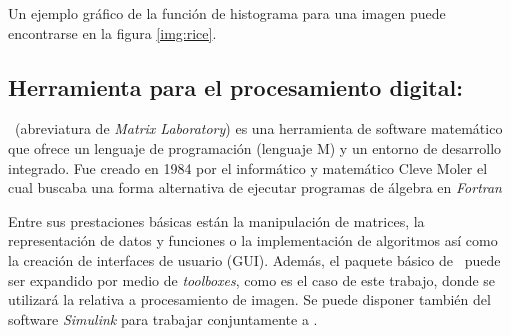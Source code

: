\documentclass[main]{subfiles}
\begin{document}
Un ejemplo gráfico de la función de histograma para una imagen puede encontrarse en la figura \ref{img:rice}.


\subsection{Herramienta para el procesamiento digital: \MATLAB}\label{sec:matlab}
\MATLAB\ (abreviatura de {\em Matrix Laboratory}) es una herramienta de software matemático que ofrece un lenguaje de programación (lenguaje M) y un entorno de desarrollo integrado. Fue creado en 1984 por el informático y matemático Cleve Moler el cual buscaba una forma alternativa de ejecutar programas de álgebra en {\em Fortran}

Entre sus prestaciones básicas están la manipulación de matrices, la representación de datos y funciones o la implementación de algoritmos así como la creación de interfaces de usuario (GUI). Además, el paquete básico de \MATLAB\ puede ser expandido por medio de {\em toolboxes}, como es el caso de este trabajo, donde se utilizará la relativa  a procesamiento de imagen. Se puede disponer también del software {\em Simulink} para trabajar conjuntamente a \MATLAB.
\end{document}
